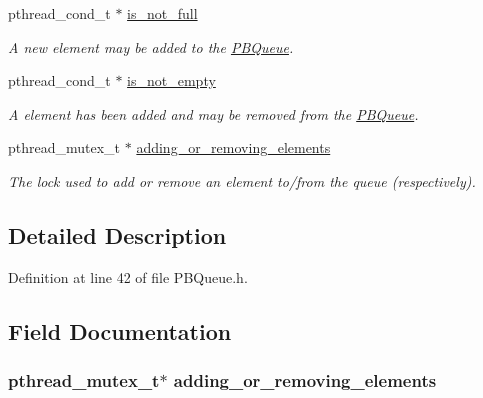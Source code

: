 \begin{DoxyCompactItemize}
pthread\+\_\+cond\+\_\+t $\ast$ \hyperlink{struct_p_b_queue_a67d9c501515653db90eee366c6471782}{is\+\_\+not\+\_\+full}
\begin{DoxyCompactList}\small\item\em A new element may be added to the \hyperlink{struct_p_b_queue}{P\+B\+Queue}. \end{DoxyCompactList}\item 
pthread\+\_\+cond\+\_\+t $\ast$ \hyperlink{struct_p_b_queue_a2de5f9fe801e3f825c62cbad497ac623}{is\+\_\+not\+\_\+empty}
\begin{DoxyCompactList}\small\item\em A element has been added and may be removed from the \hyperlink{struct_p_b_queue}{P\+B\+Queue}. \end{DoxyCompactList}\item 
pthread\+\_\+mutex\+\_\+t $\ast$ \hyperlink{struct_p_b_queue_aa6e3df38a61e0da51d311a7596ef413c}{adding\+\_\+or\+\_\+removing\+\_\+elements}
\begin{DoxyCompactList}\small\item\em The lock used to add or remove an element to/from the queue (respectively). \end{DoxyCompactList}\end{DoxyCompactItemize}


\subsection{Detailed Description}


Definition at line 42 of file P\+B\+Queue.\+h.



\subsection{Field Documentation}
\hypertarget{struct_p_b_queue_aa6e3df38a61e0da51d311a7596ef413c}{}
\subsubsection[{adding\+\_\+or\+\_\+removing\+\_\+elements}]{\setlength{\rightskip}{0pt plus 5cm}pthread\+\_\+mutex\+\_\+t$\ast$ adding\+\_\+or\+\_\+removing\+\_\+elements}\label{struct_p_b_queue_aa6e3df38a61e0da51d311a7596ef413c}


